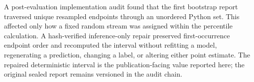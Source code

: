 A post-evaluation implementation audit found that the first bootstrap report traversed unique resampled endpoints through an unordered Python set. This affected only how a fixed random stream was assigned within the percentile calculation. A hash-verified inference-only repair preserved first-occurrence endpoint order and recomputed the interval without refitting a model, regenerating a prediction, changing a label, or altering either point estimate. The repaired deterministic interval is the publication-facing value reported here; the original sealed report remains versioned in the audit chain.
